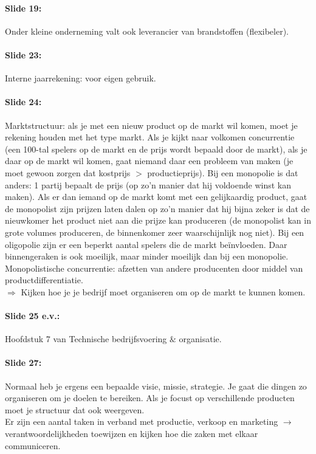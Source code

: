 \documentclass[10pt,a4paper]{report}
\begin{document}
\paragraph{Slide 19:} Onder kleine onderneming valt ook leverancier van brandstoffen (flexibeler).

\paragraph{Slide 23:} Interne jaarrekening: voor eigen gebruik.

\paragraph{Slide 24:} Marktstructuur: als je met een nieuw product op de markt wil komen, moet je rekening houden met het type markt. Als je kijkt naar volkomen concurrentie (een 100-tal spelers op de markt en de prijs wordt bepaald door de markt), als je daar op de markt wil komen, gaat niemand daar een probleem van maken (je moet gewoon zorgen dat kostprijs $>$ productieprijs). Bij een monopolie is dat anders: 1 partij bepaalt de prijs (op zo'n manier dat hij voldoende winst kan maken). Als er dan iemand op de markt komt met een gelijkaardig product, gaat de monopolist zijn prijzen laten dalen op zo'n manier dat hij bijna zeker is dat de nieuwkomer het product niet aan die prijze kan produceren (de monopolist kan in grote volumes produceren, de binnenkomer zeer waarschijnlijk nog niet). Bij een oligopolie zijn er een beperkt aantal spelers die de markt be\"invloeden. Daar binnengeraken is ook moeilijk, maar minder moeilijk dan bij een monopolie. Monopolistische concurrentie: afzetten van andere producenten door middel van productdifferentiatie.\\
$\Rightarrow$ Kijken hoe je je bedrijf moet organiseren om op de markt te kunnen komen.

\paragraph{Slide 25 e.v.:} Hoofdstuk 7 van Technische bedrijfsvoering $\&$ organisatie.

\paragraph{Slide 27:} Normaal heb je ergens een bepaalde visie, missie, strategie. Je gaat die dingen zo organiseren om je doelen te bereiken. Als je focust op verschillende producten moet je structuur dat ook weergeven.\\
Er zijn een aantal taken in verband met productie, verkoop en marketing $\rightarrow$ verantwoordelijkheden toewijzen en kijken hoe die zaken met elkaar communiceren.
\end{document}
